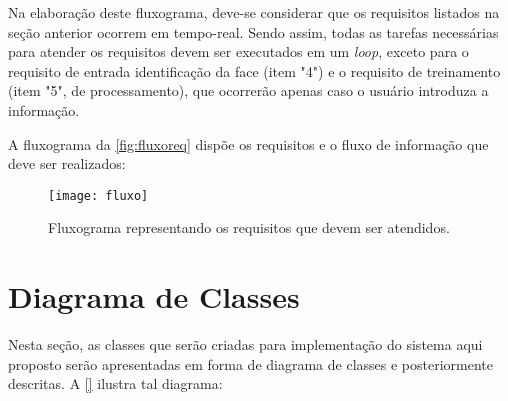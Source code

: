 Na elaboração deste fluxograma, deve-se considerar que os requisitos listados na seção anterior ocorrem em tempo-real. Sendo assim, todas as tarefas necessárias para atender os requisitos devem ser executados em um \textit{loop}, exceto para o requisito de entrada identificação da face (item "4") e o requisito de treinamento (item "5", de processamento), que ocorrerão apenas caso o usuário introduza a informação.

A fluxograma da \autoref{fig:fluxoreq} dispõe os requisitos e o fluxo de informação que deve ser realizados:


\begin{figure}[h]
	\centering
	\texttt{[image: fluxo]}
	\caption{Fluxograma representando os requisitos que devem ser atendidos.}
	\label{fig:fluxoreq}
\end{figure}


\section{Diagrama de Classes}\label{sec:diagclasses}
Nesta seção, as classes que serão criadas para implementação do sistema aqui proposto serão apresentadas em forma de diagrama de classes e posteriormente descritas. A \autoref{} ilustra tal diagrama:









%
